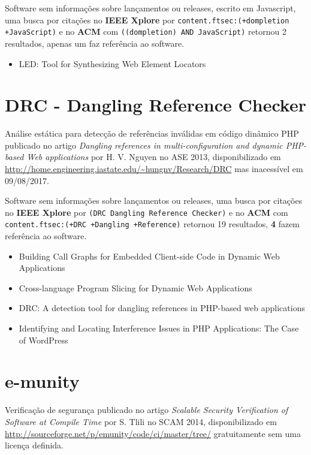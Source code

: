 Software sem informações sobre lançamentos ou releases,
escrito em Javascript,
uma busca por citações no {\bf IEEE Xplore} por
\texttt{content.ftsec:(+dompletion +JavaScript)}
e no {\bf ACM} com
\texttt{((dompletion) AND JavaScript)}
retornou
2 resultados,
apenas um faz referência ao software.

\begin{itemize}
\item LED: Tool for Synthesizing Web Element Locators
\end{itemize}


\section{DRC - Dangling Reference Checker}

Análise estática para detecção de referências inválidas em código dinâmico PHP
publicado no artigo {\it Dangling references in multi-configuration and dynamic PHP-based Web applications}
por H. V. Nguyen
no ASE 2013,
disponibilizado em \url{http://home.engineering.iastate.edu/~hungnv/Research/DRC}
mas inacessível em 09/08/2017.

Software sem informações sobre lançamentos ou releases,
uma busca por citações no {\bf IEEE Xplore} por
\texttt{(DRC Dangling Reference Checker)}
e no {\bf ACM} com
\texttt{content.ftsec:(+DRC +Dangling +Reference)}
retornou
19 resultados,
{\bf 4} fazem referência ao software.

\begin{itemize}
\item Building Call Graphs for Embedded Client-side Code in Dynamic Web Applications
\item Cross-language Program Slicing for Dynamic Web Applications
\item DRC: A detection tool for dangling references in PHP-based web applications
\item Identifying and Locating Interference Issues in PHP Applications: The Case of WordPress
\end{itemize}


\section{e-munity}

Verificação de segurança
publicado no artigo {\it Scalable Security Verification of Software at Compile Time}
por S. Tlili
no SCAM 2014,
disponibilizado em \url{http://sourceforge.net/p/emunity/code/ci/master/tree/}
gratuitamente
sem uma licença definida.


